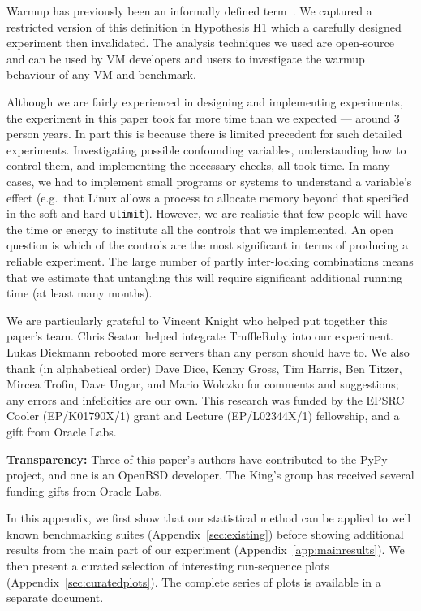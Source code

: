 \documentclass[acmsmall]{acmart}\settopmatter{printfolios=true}
\begin{document}
Warmup has previously been an informally defined term~\cite{seaton15phd}. We
captured a restricted version of this definition in Hypothesis H1 which
a carefully designed experiment then invalidated. The analysis
techniques we used are open-source and can be used by VM developers and users to investigate the
warmup behaviour of any VM and benchmark.

Although we are fairly experienced in designing and implementing
experiments, the experiment in this paper took far more time than we expected
--- around 3 person years. In part this is because there is limited precedent for such detailed
experiments. Investigating possible confounding variables, understanding how to
control them, and implementing the necessary checks, all took time. In many
cases, we had to implement small programs or systems to understand a variable's
effect (e.g.~that Linux allows a process to allocate memory beyond that
specified in the soft and hard \texttt{ulimit}). However, we are realistic that
few people will have the time or energy to institute all the controls that we
implemented. An open question is which of the controls are the most significant
in terms of producing a reliable experiment. The large number of partly
inter-locking combinations means that we estimate that untangling this will
require significant additional running time (at least many months).


\begin{acks}
We are particularly grateful to Vincent Knight who helped put together this
paper's team. Chris Seaton helped integrate TruffleRuby into our experiment.
Lukas Diekmann rebooted more servers than any person should have to.
We also thank (in alphabetical order) Dave Dice, Kenny Gross, Tim Harris, Ben
Titzer, Mircea Trofin, Dave Ungar, and Mario Wolczko for comments and suggestions; any
errors and infelicities are our own. This research was funded by the EPSRC
Cooler (EP/K01790X/1) grant and Lecture (EP/L02344X/1) fellowship,
and a gift from Oracle Labs.

\textbf{Transparency:} Three of this paper's authors have contributed
to the PyPy project, and one is an OpenBSD developer. The
King's group has received several funding gifts from Oracle Labs.
\end{acks}




\clearpage

\appendix

\noindent In this appendix, we first show that our statistical method
can be applied to well known benchmarking suites (Appendix~\ref{sec:existing})
before showing additional results from the main part of our experiment
(Appendix~\ref{app:mainresults}). We
then present a curated selection of interesting run-sequence
plots (Appendix~\ref{sec:curatedplots}). The complete series of plots is available in a separate
document.
\end{document}
